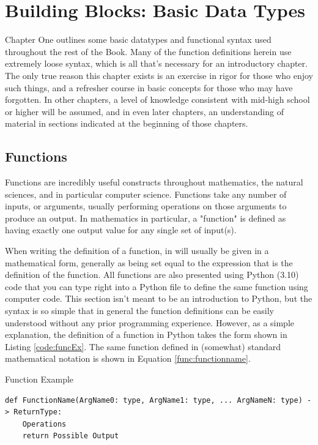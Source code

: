 \chapter{Building Blocks: Basic Data Types}\label{chpt:building-blocks}

Chapter One outlines some basic datatypes and functional syntax used throughout the rest of the Book. Many of the function definitions herein use extremely loose syntax, which is all that's necessary for an introductory chapter. The only true reason this chapter exists is an exercise in rigor for those who enjoy such things, and a refresher course in basic concepts for those who may have forgotten. In other chapters, a level of knowledge consistent with mid-high school or higher will be assumed, and in even later chapters, an understanding of material in sections indicated at the beginning of those chapters.


\section{Functions}

Functions are incredibly useful constructs throughout mathematics, the natural sciences, and in particular
computer science. Functions take any number of inputs, or arguments, usually performing operations on those arguments to
produce an output. In mathematics in particular, a "function" is defined as having exactly one output value for any single set of input(s).

When writing the definition of a function, in will usually be given in a mathematical form, generally as being set equal to the expression that is the definition of the function. All functions are also presented using Python (3.10) code that you can type right into a Python file to define the same function using computer code. This section isn't meant to be an introduction to Python, but the syntax is so simple that in general the function definitions can be easily understood without any prior programming experience. However, as a simple explanation, the definition of a function in Python takes the form shown in Listing \ref{code:funcEx}. The same function defined in (somewhat) standard mathematical notation is shown in Equation \ref{func:functionname}.

\begin{listing}[H]
\caption{Function Example}\label{code:funcEx}
\begin{verbatim}
def FunctionName(ArgName0: type, ArgName1: type, ... ArgNameN: type) -> ReturnType:
	Operations
	return Possible Output
\end{verbatim}
\end{listing}

